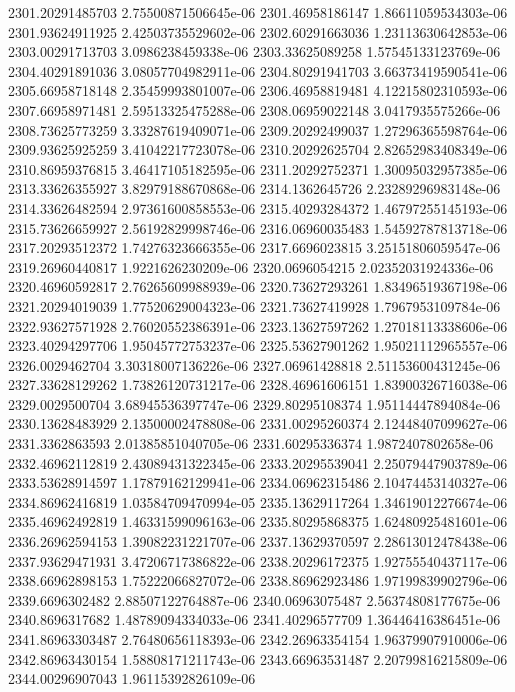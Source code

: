 {2301.20291485703 2.75500871506645e-06
2301.46958186147 1.86611059534303e-06
2301.93624911925 2.42503735529602e-06
2302.60291663036 1.23113630642853e-06
2303.00291713703 3.0986238459338e-06
2303.33625089258 1.57545133123769e-06
2304.40291891036 3.08057704982911e-06
2304.80291941703 3.66373419590541e-06
2305.66958718148 2.35459993801007e-06
2306.46958819481 4.12215802310593e-06
2307.66958971481 2.59513325475288e-06
2308.06959022148 3.0417935575266e-06
2308.73625773259 3.33287619409071e-06
2309.20292499037 1.27296365598764e-06
2309.93625925259 3.41042217723078e-06
2310.20292625704 2.82652983408349e-06
2310.86959376815 3.46417105182595e-06
2311.20292752371 1.30095032957385e-06
2313.33626355927 3.82979188670868e-06
2314.1362645726 2.23289296983148e-06
2314.33626482594 2.97361600858553e-06
2315.40293284372 1.46797255145193e-06
2315.73626659927 2.56192829998746e-06
2316.06960035483 1.54592787813718e-06
2317.20293512372 1.74276323666355e-06
2317.6696023815 3.25151806059547e-06
2319.26960440817 1.9221626230209e-06
2320.0696054215 2.02352031924336e-06
2320.46960592817 2.76265609988939e-06
2320.73627293261 1.83496519367198e-06
2321.20294019039 1.77520629004323e-06
2321.73627419928 1.7967953109784e-06
2322.93627571928 2.76020552386391e-06
2323.13627597262 1.27018113338606e-06
2323.40294297706 1.95045772753237e-06
2325.53627901262 1.95021112965557e-06
2326.0029462704 3.30318007136226e-06
2327.06961428818 2.51153600431245e-06
2327.33628129262 1.73826120731217e-06
2328.46961606151 1.83900326716038e-06
2329.0029500704 3.68945536397747e-06
2329.80295108374 1.95114447894084e-06
2330.13628483929 2.13500002478808e-06
2331.00295260374 2.12448407099627e-06
2331.3362863593 2.01385851040705e-06
2331.60295336374 1.9872407802658e-06
2332.46962112819 2.43089431322345e-06
2333.20295539041 2.25079447903789e-06
2333.53628914597 1.17879162129941e-06
2334.06962315486 2.10474453140327e-06
2334.86962416819 1.03584709470994e-05
2335.13629117264 1.34619012276674e-06
2335.46962492819 1.46331599096163e-06
2335.80295868375 1.62480925481601e-06
2336.26962594153 1.39082231221707e-06
2337.13629370597 2.28613012478438e-06
2337.93629471931 3.47206717386822e-06
2338.20296172375 1.92755540437117e-06
2338.66962898153 1.75222066827072e-06
2338.86962923486 1.97199839902796e-06
2339.6696302482 2.88507122764887e-06
2340.06963075487 2.56374808177675e-06
2340.8696317682 1.48789094334033e-06
2341.40296577709 1.36446416386451e-06
2341.86963303487 2.76480656118393e-06
2342.26963354154 1.96379907910006e-06
2342.86963430154 1.58808171211743e-06
2343.66963531487 2.20799816215809e-06
2344.00296907043 1.96115392826109e-06
}
